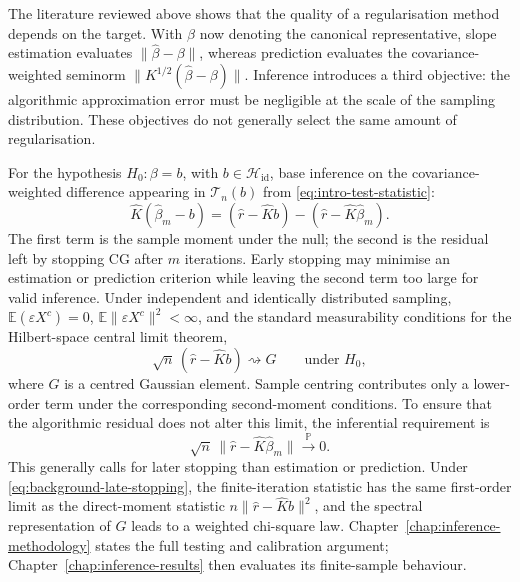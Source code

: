 The literature reviewed above shows that the quality of a regularisation method depends on the target. With $\beta$ now denoting the canonical representative, slope estimation evaluates $\|\widehat\beta-\beta\|$, whereas prediction evaluates the covariance-weighted seminorm $\|K^{1/2}(\widehat\beta-\beta)\|$. Inference introduces a third objective: the algorithmic approximation error must be negligible at the scale of the sampling distribution. These objectives do not generally select the same amount of regularisation.

For the hypothesis $H_0:\beta=b$, with
$b\in\mathcal H_{\mathrm{id}}$, \textcite{babii_carrasco_tsafack_2026} base inference on
the covariance-weighted difference appearing in
$\mathcal T_n(b)$ from \eqref{eq:intro-test-statistic}:
\begin{equation}
    \widehat K(\widehat\beta_m-b)
    =(\widehat r-\widehat Kb)
      -(\widehat r-\widehat K\widehat\beta_m).
    \label{eq:inference-residual-decomposition-background}
\end{equation}
The first term is the sample moment under the null; the second is the residual left by stopping CG after $m$ iterations. Early stopping may minimise an estimation or prediction criterion while leaving the second term too large for valid inference. Under independent and identically distributed sampling, $\mathbb E(\varepsilon X^c)=0$, $\mathbb E\|\varepsilon X^c\|^2<\infty$, and the standard measurability conditions for the Hilbert-space central limit theorem,
\begin{equation}
    \sqrt n\,(\widehat r-\widehat Kb)
    \rightsquigarrow G
    \qquad\text{under }H_0,
    \label{eq:background-moment-clt}
\end{equation}
where $G$ is a centred Gaussian element.  Sample centring contributes only a
lower-order term under the corresponding second-moment conditions.  To ensure
that the algorithmic residual does not alter this limit, the inferential
requirement is
\begin{equation}
    \sqrt n\,
    \|\widehat r-\widehat K\widehat\beta_m\|
    \xrightarrow{\mathbb P}0.
    \label{eq:background-late-stopping}
\end{equation}
This generally calls for later stopping than estimation or prediction.  Under
\eqref{eq:background-late-stopping}, the finite-iteration statistic has the same
first-order limit as the direct-moment statistic
$n\|\widehat r-\widehat Kb\|^2$, and the spectral representation of $G$ leads
to a weighted chi-square law.  Chapter~\ref{chap:inference-methodology} states
the full testing and calibration argument; Chapter~\ref{chap:inference-results}
then evaluates its finite-sample behaviour.

